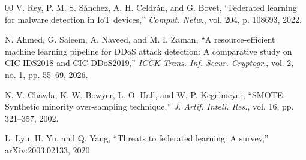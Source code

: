 \documentclass[conference, a4paper]{IEEEtran}
\begin{document}
\begin{thebibliography}{00}
 V. Rey, P. M. S. S\'anchez, A. H. Celdr\'an, and G. Bovet, ``Federated learning for malware detection in IoT devices,'' \textit{Comput. Netw.}, vol. 204, p. 108693, 2022.

 N. Ahmed, G. Saleem, A. Naveed, and M. I. Zaman, ``A resource-efficient machine learning pipeline for DDoS attack detection: A comparative study on CIC-IDS2018 and CIC-DDoS2019,'' \textit{ICCK Trans. Inf. Secur. Cryptogr.}, vol. 2, no. 1, pp. 55--69, 2026.

 N. V. Chawla, K. W. Bowyer, L. O. Hall, and W. P. Kegelmeyer, ``SMOTE: Synthetic minority over-sampling technique,'' \textit{J. Artif. Intell. Res.}, vol. 16, pp. 321--357, 2002.

 L. Lyu, H. Yu, and Q. Yang, ``Threats to federated learning: A survey,'' arXiv:2003.02133, 2020.
\end{thebibliography}
\end{document}
